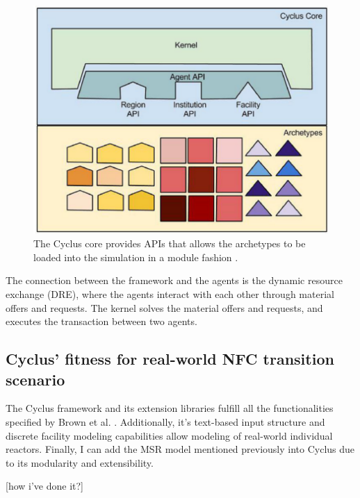 \begin{figure}[htbp!]
	\begin{center}
		\includegraphics[scale=0.2]{./images/cyclus_core.png}
	\end{center}
	\caption{The Cyclus core provides APIs that allows the archetypes
			to be loaded into the simulation in a module fashion
			\cite{huff_fundamental_2016}.}
	\label{fig:core}
\end{figure}

The connection between the framework and the agents is
the dynamic resource exchange (DRE), where the agents
interact with each other through material offers and requests.
The kernel solves the material offers and requests, and executes
the transaction between two agents.

\subsection{Cyclus' fitness for real-world \gls{NFC} transition scenario}
The Cyclus framework and its extension libraries fulfill all the functionalities
specified by Brown et al. \cite{brown_identification_2016}. Additionally,
it's text-based input structure and discrete facility modeling capabilities
allow modeling of real-world individual reactors. Finally, I can add
the \gls{MSR} model mentioned previously into Cyclus due to its
modularity and extensibility.

[how i've done it?]


